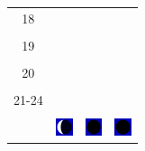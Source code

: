 \documentclass[a4paper,12pt, tikz]{scrartcl}
\begin{document}
\begin{tabularx}{\linewidth}{|c|X|X|X|}
      \hline
      18&   &       &    \\
        &   &       &    \\
      \hline
      19&   &       &    \\
        &   &       &    \\
      \hline
      20&   &       &    \\
        &   &       &    \\
      \hline
      21-24&   &       &    \\
        &   &       &    \\
      \hline  
      & \vspace{0.01cm} \centerline{\includegraphics[width=0.5cm]{moon_phases/Moon_phase_7.svg.png}} \vspace{0.1cm} & \vspace{0.01cm} \centerline{\includegraphics[width=0.5cm]{moon_phases/Moon_phase_0.svg.png}} \vspace{0.1cm} & \vspace{0.01cm} \centerline{\includegraphics[width=0.5cm]{moon_phases/Moon_phase_0.svg.png}} \vspace{0.1cm}\\
      \hline   
    \end{tabularx}




    \newpage

        \noindent
\end{document}
